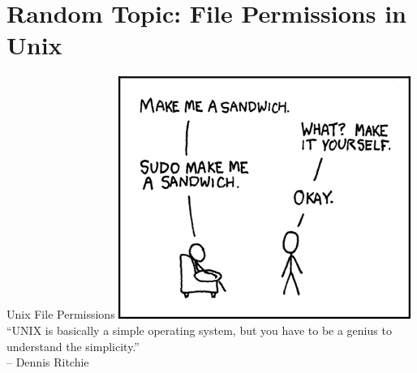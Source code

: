 \documentclass[11pt]{beamer}
\begin{document}
\section[Permissions]{Random Topic: File Permissions in Unix}
\begin{frame}{Unix File Permissions}
\center
\includegraphics[scale=0.4]{sandwich.png} \\
``UNIX is basically a simple operating system, but you have to be a genius to understand the simplicity.''  \\ -- Dennis Ritchie
\end{frame}
\end{document}
